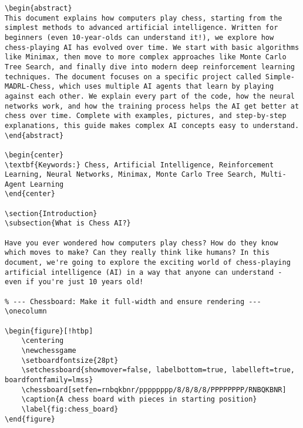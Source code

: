 \documentclass[11pt]{article}
\begin{document}
\begin{lstlisting}[style=Python]
\begin{abstract}
This document explains how computers play chess, starting from the simplest methods to advanced artificial intelligence. Written for beginners (even 10-year-olds can understand it!), we explore how chess-playing AI has evolved over time. We start with basic algorithms like Minimax, then move to more complex approaches like Monte Carlo Tree Search, and finally dive into modern deep reinforcement learning techniques. The document focuses on a specific project called Simple-MADRL-Chess, which uses multiple AI agents that learn by playing against each other. We explain every part of the code, how the neural networks work, and how the training process helps the AI get better at chess over time. Complete with examples, pictures, and step-by-step explanations, this guide makes complex AI concepts easy to understand.
\end{abstract}

\begin{center}
\textbf{Keywords:} Chess, Artificial Intelligence, Reinforcement Learning, Neural Networks, Minimax, Monte Carlo Tree Search, Multi-Agent Learning
\end{center}

\section{Introduction}
\subsection{What is Chess AI?}

Have you ever wondered how computers play chess? How do they know which moves to make? Can they really think like humans? In this document, we're going to explore the exciting world of chess-playing artificial intelligence (AI) in a way that anyone can understand - even if you're just 10 years old!

% --- Chessboard: Make it full-width and ensure rendering ---
\onecolumn

\begin{figure}[!htbp]
    \centering
    \newchessgame
    \setboardfontsize{28pt}
    \setchessboard{showmover=false, labelbottom=true, labelleft=true, boardfontfamily=lmss}
    \chessboard[setfen=rnbqkbnr/pppppppp/8/8/8/8/PPPPPPPP/RNBQKBNR]
    \caption{A chess board with pieces in starting position}
    \label{fig:chess_board}
\end{figure}


\end{lstlisting}
\end{document}
